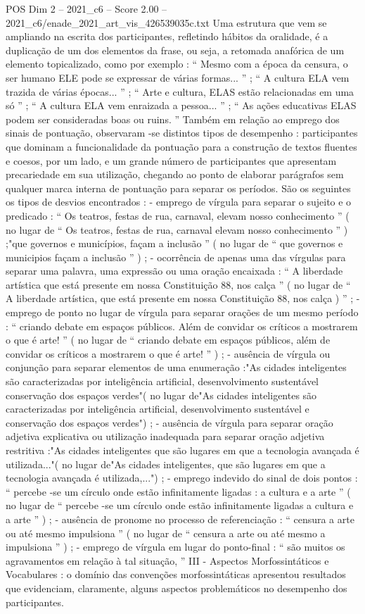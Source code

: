 \begin{textsample}{POS Dim 2 – 2021\_c6 – Score 2.00 – 2021\_c6/enade\_2021\_art\_vis\_426539035c.txt}
Uma estrutura que vem se ampliando na escrita dos participantes, refletindo hábitos da oralidade, é a duplicação de um dos elementos da frase, ou seja, a retomada anafórica de um elemento topicalizado, como por exemplo : “ Mesmo com a época da censura, o ser humano ELE pode se expressar de várias formas... ” ; “ A cultura ELA vem trazida de várias épocas... ” ; “ Arte e cultura, ELAS estão relacionadas em uma só ” ; “ A cultura ELA vem enraizada a pessoa... ” ; “ As ações educativas ELAS podem ser consideradas boas ou ruins. ” Também em relação ao emprego dos sinais de pontuação, observaram -se distintos tipos de desempenho : participantes que dominam a funcionalidade da pontuação para a construção de textos fluentes e coesos, por um lado, e um grande número de participantes que apresentam precariedade em sua utilização, chegando ao ponto de elaborar parágrafos sem qualquer marca interna de pontuação para separar os períodos.
São os seguintes os tipos de desvios encontrados : - emprego de vírgula para separar o sujeito e o predicado : “ Os teatros, festas de rua, carnaval, elevam nosso conhecimento ” ( no lugar de “ Os teatros, festas de rua, carnaval elevam nosso conhecimento ” ) ;"que governos e municípios, façam a inclusão ” ( no lugar de “ que governos e municipios façam a inclusão ” ) ; - ocorrência de apenas uma das vírgulas para separar uma palavra, uma expressão ou uma oração encaixada : “ A liberdade artística que está presente em nossa Constituição 88, nos calça ” ( no lugar de “ A liberdade artística, que está presente em nossa Constituição 88, nos calça ) ” ; - emprego de ponto no lugar de vírgula para separar orações de um mesmo período : “ criando debate em espaços públicos.
Além de convidar os críticos a mostrarem o que é arte! ” ( no lugar de “ criando debate em espaços públicos, além de convidar os críticos a mostrarem o que é arte! ” ) ; - ausência de vírgula ou conjunção para separar elementos de uma enumeração :"As cidades inteligentes são caracterizadas por inteligência artificial, desenvolvimento sustentável conservação dos espaços verdes"( no lugar de"As cidades inteligentes são caracterizadas por inteligência artificial, desenvolvimento sustentável e conservação dos espaços verdes") ; - ausência de vírgula para separar oração adjetiva explicativa ou utilização inadequada para separar oração adjetiva restritiva :"As cidades inteligentes que são lugares em que a tecnologia avançada é utilizada..."( no lugar de"As cidades inteligentes, que são lugares em que a tecnologia avançada é utilizada,...") ; - emprego indevido do sinal de dois pontos : “ percebe -se um círculo onde estão infinitamente ligadas : a cultura e a arte ” ( no lugar de “ percebe -se um círculo onde estão infinitamente ligadas a cultura e a arte ” ) ; - ausência de pronome no processo de referenciação : “ censura a arte ou até mesmo impulsiona ” ( no lugar de “ censura a arte ou até mesmo a impulsiona ” ) ; - emprego de vírgula em lugar do ponto-final : “ são muitos os agravamentos em relação à tal situação, ” III - Aspectos Morfossintáticos e Vocabulares : o domínio das convenções morfossintáticas apresentou resultados que evidenciam, claramente, alguns aspectos problemáticos no desempenho dos participantes.

\end{textsample}
